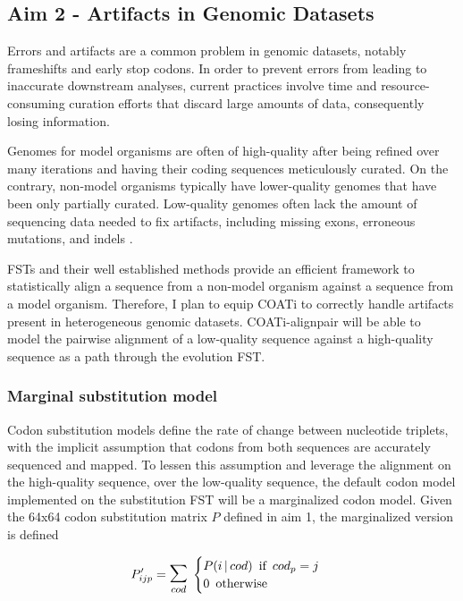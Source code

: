 \subsection{Aim 2 - Artifacts in Genomic Datasets}

Errors and artifacts are a common problem in genomic datasets, notably
frameshifts and early stop codons.
In order to prevent errors from leading to inaccurate downstream analyses,
current practices involve time and resource-consuming curation efforts that
discard large amounts of data, consequently losing information.

Genomes for model organisms are often of high-quality after being refined over
many iterations and having their coding sequences meticulously curated.
On the contrary, non-model organisms typically have lower-quality genomes that
have been only partially curated.
Low-quality genomes often lack the amount of sequencing data needed to fix
artifacts, including missing exons, erroneous mutations, and indels
\parencite{jackman2018tigmint}.

FSTs and their well established methods provide an efficient framework to
statistically align a sequence from a non-model organism against a sequence from
a model organism.
Therefore, I plan to equip COATi to correctly handle artifacts present in
heterogeneous genomic datasets.
COATi-alignpair will be able to model the pairwise alignment of a low-quality
sequence against a high-quality sequence as a path through the evolution FST.

\subsubsection{Marginal substitution model}


Codon substitution models define the rate of change between nucleotide triplets,
with the implicit assumption that codons from both sequences are accurately
sequenced and mapped.
To lessen this assumption and leverage the alignment on the high-quality
sequence, over the low-quality sequence, the default codon model implemented
on the substitution FST will be a marginalized codon model.
Given the 64x64 codon substitution matrix $P$ defined in aim 1, the
marginalized version is defined

\[P'_{ijp} = \mathlarger{\mathlarger{\sum}}_{cod} \thickspace \begin{cases}
	P(i \thinspace | \thinspace cod) \enspace \text{if} \enspace cod_p = j\\
	0 \enspace \text{otherwise}
\end{cases} \]


